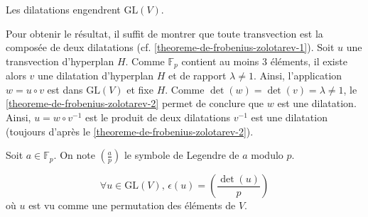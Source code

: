 
	\begin{lemma}
		\label{theoreme-de-frobenius-zolotarev-3}
		Les dilatations engendrent $\mathrm{GL}(V)$.
	\end{lemma}

	\begin{demonstration}
		Pour obtenir le résultat, il suffit de montrer que toute transvection est la composée de deux dilatations (cf. \cref{theoreme-de-frobenius-zolotarev-1}). Soit $u$ une transvection d'hyperplan $H$. Comme $\mathbb{F}_p$ contient au moins $3$ éléments, il existe alors $v$ une dilatation d'hyperplan $H$ et de rapport $\lambda \neq 1$.
		\newpar
		Ainsi, l'application $w = u \circ v$ est dans $\mathrm{GL}(V)$ et fixe $H$. Comme $\det(w) = \det(v) = \lambda \neq 1$, le \cref{theoreme-de-frobenius-zolotarev-2} permet de conclure que $w$ est une dilatation. Ainsi, $u = w \circ v^{-1}$ est le produit de deux dilatations $v^{-1}$ est une dilatation (toujours d'après le \cref{theoreme-de-frobenius-zolotarev-2}).
	\end{demonstration}

	\begin{notation}
		Soit $a \in \mathbb{F}_p$. On note $\left( \frac{a}{p} \right)$ le symbole de Legendre de $a$ modulo $p$.
	\end{notation}

	\begin{theorem}
		\[ \forall u \in \mathrm{GL}(V), \, \epsilon(u) = \left( \frac{\det(u)}{p} \right) \]
		où $u$ est vu comme une permutation des éléments de $V$.
	\end{theorem}

